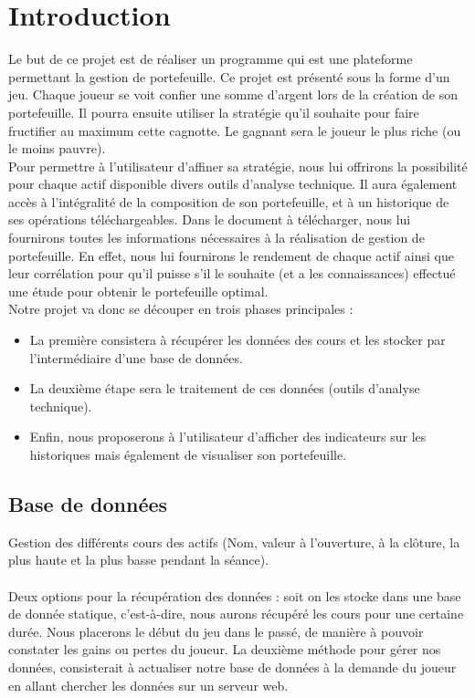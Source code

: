 \section{Introduction}

Le but de ce projet est de réaliser un programme qui est une plateforme permettant la gestion de portefeuille. Ce projet est présenté sous la forme d'un jeu. Chaque joueur se voit confier une somme d'argent lors de la création de son portefeuille. Il pourra ensuite utiliser la stratégie qu'il souhaite pour faire fructifier au maximum cette cagnotte. Le gagnant sera le joueur le plus riche (ou le moins pauvre).\\

Pour permettre à l'utilisateur d'affiner sa stratégie, nous lui offrirons la possibilité pour chaque actif disponible divers outils d’analyse technique. Il aura également accès à l'intégralité de la composition de son portefeuille, et à un historique de ses opérations téléchargeables. Dans le document à télécharger, nous lui fournirons toutes les informations nécessaires à la réalisation de gestion de portefeuille. En effet, nous lui fournirons le rendement de chaque actif ainsi que leur corrélation pour qu'il puisse s'il le souhaite (et a les connaissances) effectué une étude pour obtenir le portefeuille optimal.\\

Notre projet va donc se découper en trois phases principales : 
\begin{itemize}
\item La première consistera à récupérer les données des cours et les stocker par l’intermédiaire d’une base de données.
\item La deuxième étape sera le traitement de ces données (outils d’analyse technique).
\item Enfin, nous proposerons à l’utilisateur d'afficher des indicateurs sur les historiques mais également de visualiser son portefeuille. 
\end{itemize}

\subsection{Base de données}
Gestion des différents cours des actifs (Nom, valeur à l’ouverture, à la clôture, la plus haute et la plus basse pendant la séance). \\ \\ 
Deux options pour la récupération des données : soit on les stocke dans une base de donnée statique, c’est-à-dire, nous aurons récupéré les cours pour une certaine durée. Nous placerons le début du jeu dans le passé, de manière à pouvoir constater les gains ou pertes du joueur. La deuxième méthode pour gérer nos données, consisterait à actualiser notre base de données à la demande du joueur en allant chercher les données sur un serveur web. 

